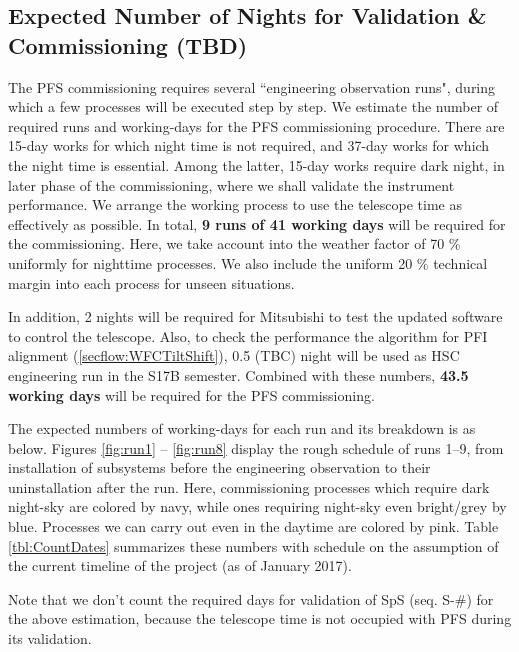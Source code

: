 \subsection{Expected Number of Nights for Validation \& Commissioning (TBD)}
The PFS commissioning requires several ``engineering observation runs", during which a few processes will be executed step by step.
We estimate the number of required runs and working-days for the PFS commissioning procedure.
There are 15-day works for which night time is not required, and 37-day works for which the night time is essential.
Among the latter, 15-day works require dark night, in later phase of the commissioning, where we shall validate the instrument performance.
We arrange the working process to use the telescope time as effectively as possible.
In total, {\bf 9 runs of 41 working days} will be  required for the commissioning. 
Here, we take account into the weather factor of 70 \% uniformly  for nighttime processes.
We also include the uniform 20 \% technical margin into each process for unseen situations.

In addition, 2 nights will be required for Mitsubishi to test the updated software to control the telescope.
Also, to check the performance the algorithm for PFI alignment (\ref{secflow:WFCTiltShift}), 0.5 (TBC) night will be used as HSC engineering run in the S17B semester.
Combined with these numbers, {\bf 43.5 working days} will be required for the PFS commissioning.

The expected numbers of working-days for each run and its breakdown is as below.
Figures \ref{fig:run1} -- \ref{fig:run8}  display the rough schedule of runs 1--9, from installation of subsystems before the engineering observation to their uninstallation after the run.
Here, commissioning processes which require dark night-sky are colored by navy, while ones requiring night-sky even bright/grey by blue.
Processes we can carry out even in the daytime are colored by pink.
Table \ref{tbl:CountDates} summarizes these numbers with schedule on the assumption of the current timeline of the project (as of January 2017).

Note that we don't count the required days for validation of SpS (seq. S-\#) for the above estimation, because the telescope time is not occupied with PFS during its validation.


